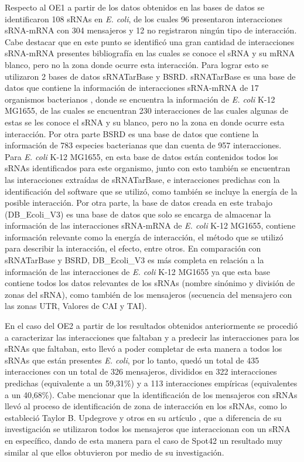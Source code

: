 Respecto al OE1 a partir de los datos obtenidos en las bases de datos se identificaron 108 sRNAs en \textit{E. coli}, de los cuales 96 presentaron interacciones sRNA-mRNA con 304 mensajeros y 12 no registraron ning\'un tipo de interacci\'on. Cabe destacar que en este punto se identific\'o una gran cantidad de interacciones sRNA-mRNA presentes bibliograf\'ia en las cuales se conoce el sRNA y su mRNA blanco, pero no la zona donde ocurre esta interacci\'on. Para lograr esto se utilizaron 2 bases de datos sRNATarBase y BSRD.
sRNATarBase es una base de datos que contiene la informaci\'on de interacciones sRNA-mRNA de 17 organismos bacterianos \cite{Cao2010}, donde se encuentra la informaci\'on de \textit{E. coli} K-12 MG1655, de las cuales se encuentran 230 interacciones de las cuales algunas de estas se les conoce el sRNA y su blanco, pero no la zona en donde ocurre esta interacci\'on. Por otra parte BSRD es una base de datos que contiene la informaci\'on de 783 especies bacterianas que dan cuenta de 957 interacciones\cite{Li}. Para \textit{E. coli} K-12 MG1655, en esta base de datos est\'an contenidos todos los sRNAs identificados para este organismo, junto con esto tambi\'en se encuentran las interacciones extra\'idas de sRNATarBase, e interacciones predichas con la identificaci\'on del software que se utiliz\'o, como tambi\'en se incluye la energ\'ia de la posible interacci\'on. Por otra parte, la base de datos creada en este trabajo (DB\_Ecoli\_V3) es una base de datos que solo se encarga de almacenar la informaci\'on de las interacciones sRNA-mRNA de \textit{E. coli} K-12 MG1655, contiene informaci\'on relevante como la energ\'ia de interacci\'on, el m\'etodo que se utiliz\'o para describir la interacci\'on, el efecto, entre otros. En comparaci\'on con sRNATarBase y BSRD, DB\_Ecoli\_V3 es m\'as completa en relaci\'on a la informaci\'on de las interacciones de \textit{E. coli} K-12 MG1655 ya que esta base contiene todos los datos relevantes de los sRNAs (nombre sin\'onimo y divisi\'on de zonas del sRNA), como tambi\'en de los mensajeros (secuencia del mensajero con las zonas UTR, Valores de CAI y TAI).

En el caso del OE2 a partir de los resultados obtenidos anteriormente se procedi\'o a caracterizar las interacciones que faltaban y a predecir las interacciones para los sRNAs que faltaban, esto llev\'o a poder completar de esta manera a todos los sRNAs que est\'an presentes \textit{E. coli}, por lo tanto, qued\'o un total de 435 interacciones con un total de 326 mensajeros, divididos en 322 interacciones predichas (equivalente a un 59,31\%) y a 113 interacciones emp\'iricas (equivalentes a un 40,68\%). Cabe mencionar que la identificaci\'on de los mensajeros con sRNAs llev\'o al proceso de identificaci\'on de zona de interacci\'on en los sRNAs, como lo estableci\'o Taylor B. Updegrove y otros en su art\'iculo \cite{Updegrove2015}, que a diferencia de su investigaci\'on se utilizaron todos los mensajeros que interaccionan con un sRNA en espec\'ifico, dando de esta manera para el caso de Spot42 un resultado muy similar al que ellos obtuvieron por medio de su investigaci\'on.

